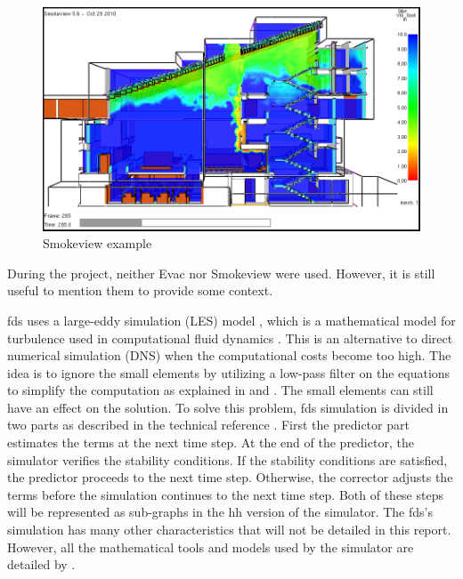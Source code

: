 \begin{figure}[h!]
  \begin{center}
    \includegraphics[scale=0.5]{img/smvexample.png}
    \caption{Smokeview example}
    \label{fig:smvexample}
  \end{center}
\end{figure}

During the project, neither Evac nor Smokeview were used. However, it is
still useful to mention them to provide some context.

\gls{fds} uses a large-eddy simulation (LES) model \cite{fdsref}, which is a
mathematical model for turbulence used in computational fluid dynamics
\cite{enwiki:les}. This is an alternative to direct numerical simulation (DNS)
when the computational costs become too high. The idea is to ignore the small
elements by utilizing a low-pass filter on the equations to simplify the
computation as explained in \cite{enwiki:les} and \cite{ferziger1996large}. The
small elements can still have an effect on the solution. To solve this problem,
\gls{fds} simulation is divided in two parts as described in the technical
reference \cite{fdsref}. First the predictor part estimates the terms at the
next time step. At the end of the predictor, the simulator verifies the
stability conditions. If the stability conditions are satisfied, the predictor
proceeds to the next time step. Otherwise, the corrector adjusts the terms
before the simulation continues to the next time step. Both of these steps will
be represented as sub-graphs in the \gls{hh} version of the simulator. The
\gls{fds}'s simulation has many other characteristics that will not be detailed
in this report. However, all the mathematical tools and models used by the
simulator are detailed by \cite{fdsref}.

